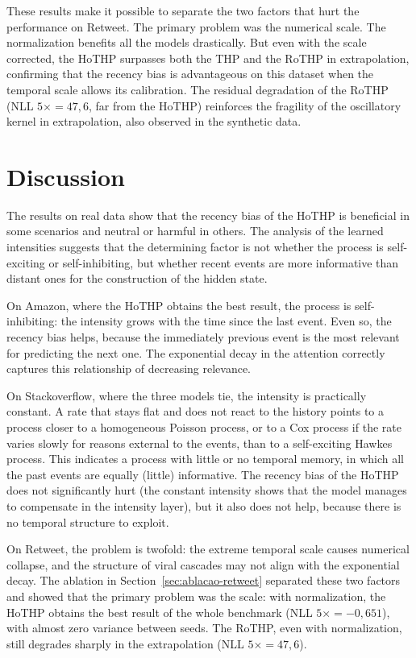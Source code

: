These results make it possible to separate the two factors that hurt the performance on Retweet. The primary problem was the numerical scale. The normalization benefits all the models drastically. But even with the scale corrected, the HoTHP surpasses both the THP and the RoTHP in extrapolation, confirming that the recency bias is advantageous on this dataset when the temporal scale allows its calibration. The residual degradation of the RoTHP (NLL $5\times = 47{,}6$, far from the HoTHP) reinforces the fragility of the oscillatory kernel in extrapolation, also observed in the synthetic data.

\section{Discussion}
\label{sec:discussao-resultados}

The results on real data show that the recency bias of the HoTHP is beneficial in some scenarios and neutral or harmful in others. The analysis of the learned intensities suggests that the determining factor is not whether the process is self-exciting or self-inhibiting, but whether recent events are more informative than distant ones for the construction of the hidden state.

On Amazon, where the HoTHP obtains the best result, the process is self-inhibiting: the intensity grows with the time since the last event. Even so, the recency bias helps, because the immediately previous event is the most relevant for predicting the next one. The exponential decay in the attention correctly captures this relationship of decreasing relevance.

On Stackoverflow, where the three models tie, the intensity is practically constant. A rate that stays flat and does not react to the history points to a process closer to a homogeneous Poisson process, or to a Cox process if the rate varies slowly for reasons external to the events, than to a self-exciting Hawkes process. This indicates a process with little or no temporal memory, in which all the past events are equally (little) informative. The recency bias of the HoTHP does not significantly hurt (the constant intensity shows that the model manages to compensate in the intensity layer), but it also does not help, because there is no temporal structure to exploit.

On Retweet, the problem is twofold: the extreme temporal scale causes numerical collapse, and the structure of viral cascades may not align with the exponential decay. The ablation in Section~\ref{sec:ablacao-retweet} separated these two factors and showed that the primary problem was the scale: with normalization, the HoTHP obtains the best result of the whole benchmark (NLL $5\times = -0{,}651$), with almost zero variance between seeds. The RoTHP, even with normalization, still degrades sharply in the extrapolation (NLL $5\times = 47{,}6$).

